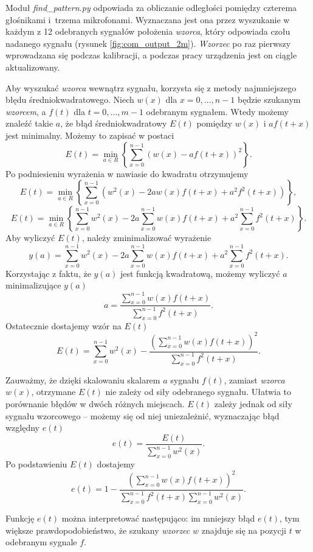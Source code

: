 Moduł \textit{find\_pattern.py} odpowiada za obliczanie odległości pomiędzy czterema głośnikami i~trzema mikrofonami.
Wyznaczana jest ona przez wyszukanie w każdym z 12 odebranych sygnałów  położenia \textit{wzorca}, który 
odpowiada czołu nadanego sygnału (rysunek \ref{fig:com_output_2m}).
\textit{Wzorzec} po raz pierwszy wprowadzana się podczas kalibracji, a  
podczas pracy urządzenia jest on ciągle aktualizowany.

Aby wyszukać \textit{wzorca} wewnątrz sygnału, korzysta się z  metody najmniejszego błędu średniokwadratowego.
Niech $w(x)$  dla $x = 0, ..., n-1$ będzie szukanym \textit{wzorcem}, a $f(t)$ dla $t = 0, ..., m-1$ odebranym sygnałem.
Wtedy możemy znaleźć takie $a$, że błąd średniokwadratowy $E(t)$ pomiędzy $w(x)$ i $a f(t+x)$ jest minimalny.
Możemy to zapisać w postaci
\[
  E(t) = \min_{a \in R} \left\{ \sum_{x=0}^{n-1}  \left( w(x) - a f(t+x) \right) ^2 \right\}.
\]
Po podniesieniu wyrażenia w nawiasie do kwadratu otrzymujemy
\[
  E(t) = \min_{a \in R} \left\{ \sum_{x=0}^{n-1}  \left( w^2(x) -2a w(x) f(t+x) + a^2 f^2(t+x) \right) \right\},
\]
\[
  E(t) = \min_{a \in R} \left\{ \sum_{x=0}^{n-1}  w^2(x) -2a \sum_{x=0}^{n-1}  w(x) f(t+x) + a^2 \sum_{x=0}^{n-1} f^2(t+x) \right\}.
\]
Aby wyliczyć $E(t)$, należy zminimalizować wyrażenie
\[
  y(a) = \sum_{x=0}^{n-1}  w^2(x) -2a \sum_{x=0}^{n-1}  w(x) f(t+x) + a^2 \sum_{x=0}^{n-1} f^2(t+x).
\]
Korzystając z faktu, że $y(a)$ jest funkcją kwadratową, możemy wyliczyć $a$ minimalizujące $y(a)$
\[
  a = \frac{ \sum\limits_{x=0}^{n-1}  w(x) f(t+x) }{ \sum\limits_{x=0}^{n-1} f^2(t+x) }.
\]
Ostatecznie dostajemy wzór na $E(t)$
\[
  E(t) = \sum_{x=0}^{n-1}  w^2(x)  - \frac {\left(\sum\limits_{x=0}^{n-1}  w(x) f(t+x) \right)^2 } { \sum\limits_{x=0}^{n-1} f^2(t+x)}.
\]

Zauważmy, że dzięki skalowaniu skalarem $a$  sygnału $f(t)$, zamiast \textit{wzorca} $w(x)$,
otrzymane $E(t)$ nie zależy od siły odebranego sygnału. Ułatwia to porównanie błędów w dwóch różnych miejscach.
$E(t)$ zależy jednak od siły sygnału wzorcowego -- możemy się od niej uniezależnić, wyznaczając
błąd względny $e(t)$
\[
  e(t) = \frac{E(t)}{\sum\limits_{x=0}^{n-1}  w^2(x)}.
\]
Po podstawieniu $E(t)$ dostajemy
\[
  e(t) = 1 - \frac {\left(\sum\limits_{x=0}^{n-1}  w(x) f(t+x) \right)^2 } { \sum\limits_{x=0}^{n-1} f^2(t+x) \sum\limits_{x=0}^{n-1}  w^2(x)}.
\]
 
 Funkcję $e(t)$  można interpretować następująco:
 im mniejszy błąd $e(t)$, tym większe prawdopodobieństwo, że szukany \textit{wzorzec} $w$ znajduje się na pozycji $t$ w 
 odebranym sygnale $f$. 

